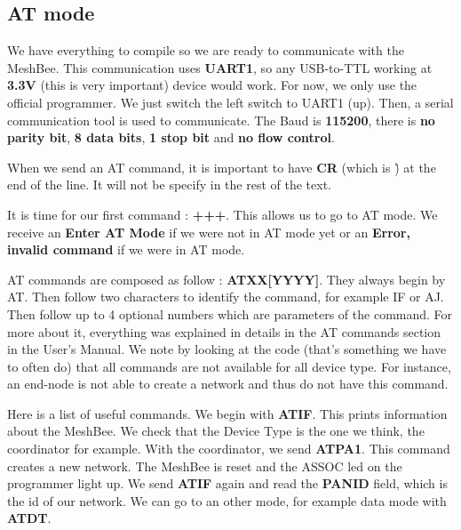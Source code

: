 \subsection{AT mode}

We have everything to compile so we are ready to communicate with the MeshBee. This communication uses \textbf{UART1}, so any USB-to-TTL working at \textbf{3.3V} (this is very important) device would work. For now, we only use the official programmer. We just switch the left switch to UART1 (up). Then, a serial communication tool is used to communicate. The Baud is \textbf{115200}, there is \textbf{no parity bit}, \textbf{8 data bits}, \textbf{1 stop bit} and \textbf{no flow control}.

When we send an AT command, it is important to have \textbf{CR} (which is \r) at the end of the line. It will not be specify in the rest of the text.

It is time for our first command : \textbf{+++}. This allows us to go to AT mode. We receive an \textbf{Enter AT Mode} if we were not in AT mode yet or an \textbf{Error, invalid command} if we were in AT mode.

AT commands are composed as follow : \textbf{ATXX[YYYY]}. They always begin by AT. Then follow two characters to identify the command, for example IF or AJ. Then follow up to 4 optional numbers which are parameters of the command. For more about it, everything was explained in details in the AT commands section in the User's Manual. We note by looking at the code (that's something we have to often do) that all commands are not available for all device type. For instance, an end-node is not able to create a network and thus do not have this command.

Here is a list of useful commands. We begin with \textbf{ATIF}. This prints information about the MeshBee. We check that the Device Type is the one we think, the coordinator for example. With the coordinator, we send \textbf{ATPA1}. This command creates a new network. The MeshBee is reset and the ASSOC led on the programmer light up. We send \textbf{ATIF} again and read the \textbf{PANID} field, which is the id of our network. We can go to an other mode, for example data mode with \textbf{ATDT}.

